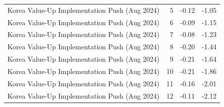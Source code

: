 \begin{table}
\begin{tabular}{lrrr}
Korea Value-Up Implementation Push (Aug 2024) & 5 & -0.12 & -1.05 \\
Korea Value-Up Implementation Push (Aug 2024) & 6 & -0.09 & -1.15 \\
Korea Value-Up Implementation Push (Aug 2024) & 7 & -0.08 & -1.23 \\
Korea Value-Up Implementation Push (Aug 2024) & 8 & -0.20 & -1.44 \\
Korea Value-Up Implementation Push (Aug 2024) & 9 & -0.21 & -1.64 \\
Korea Value-Up Implementation Push (Aug 2024) & 10 & -0.21 & -1.86 \\
Korea Value-Up Implementation Push (Aug 2024) & 11 & -0.16 & -2.01 \\
Korea Value-Up Implementation Push (Aug 2024) & 12 & -0.11 & -2.12 \\
\bottomrule
\end{tabular}
\end{table}
